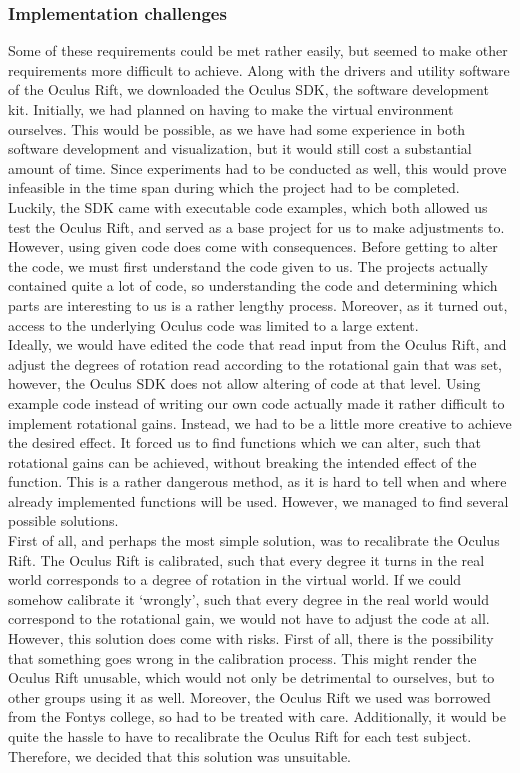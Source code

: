 \subsubsection{Implementation challenges}
Some of these requirements could be met rather easily, but seemed to make other requirements more difficult to achieve.
Along with the drivers and utility software of the Oculus Rift, we downloaded the Oculus SDK, the software development kit.
Initially, we had planned on having to make the virtual environment ourselves.
This would be possible, as we have had some experience in both software development and visualization, but it would still cost a substantial amount of time.
Since experiments had to be conducted as well, this would prove infeasible in the time span during which the project had to be completed.
Luckily, the SDK came with executable code examples, which both allowed us test the Oculus Rift, and served as a base project for us to make adjustments to. \\
However, using given code does come with consequences.
Before getting to alter the code, we must first understand the code given to us.
The projects actually contained quite a lot of code, so understanding the code and determining which parts are interesting to us is a rather lengthy process.
Moreover, as it turned out, access to the underlying Oculus code was limited to a large extent. \\

Ideally, we would have edited the code that read input from the Oculus Rift, and adjust the degrees of rotation read according to the rotational gain that was set, however, the Oculus SDK does not allow altering of code at that level.
Using example code instead of writing our own code actually made it rather difficult to implement rotational gains.
Instead, we had to be a little more creative to achieve the desired effect.
It forced us to find functions which we can alter, such that rotational gains can be achieved, without breaking the intended effect of the function.
This is a rather dangerous method, as it is hard to tell when and where already implemented functions will be used.
However, we managed to find several possible solutions. \\

First of all, and perhaps the most simple solution, was to recalibrate the Oculus Rift.
The Oculus Rift is calibrated, such that every degree it turns in the real world corresponds to a degree of rotation in the virtual world.
If we could somehow calibrate it `wrongly', such that every degree in the real world would correspond to the rotational gain, we would not have to adjust the code at all.
However, this solution does come with risks.
First of all, there is the possibility that something goes wrong in the calibration process.
This might render the Oculus Rift unusable, which would not only be detrimental to ourselves, but to other groups using it as well.
Moreover, the Oculus Rift we used was borrowed from the Fontys college, so had to be treated with care.
Additionally, it would be quite the hassle to have to recalibrate the Oculus Rift for each test subject.
Therefore, we decided that this solution was unsuitable.\\

